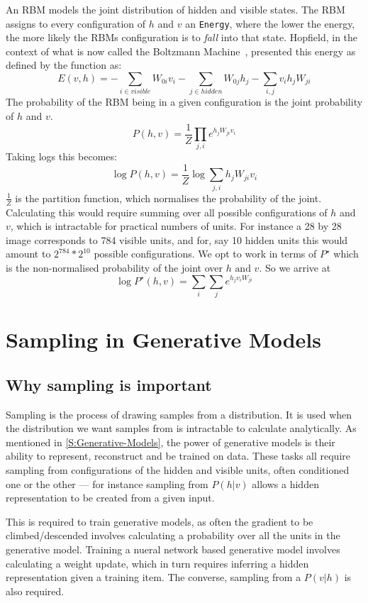 An RBM models the joint distribution of hidden and visible states.
The RBM assigns to every configuration of $h$ and $v$ an \texttt{Energy}, where the lower the energy, the more likely the RBMs configuration is to \textit{fall} into that state. Hopfield, in the context of what is now called the Boltzmann Machine~\cite{Hopfield01041982}, presented this energy as defined by the function as:
$$ E(v,h) = -\sum_{i \in visible}{W_{0i}v_i}   -\sum_{j \in hidden}{W_{0j}h_j}  -\sum_{i,j}{v_ih_jW_{ji}}  $$
The probability of the RBM being in a given configuration is the joint probability of $h$ and $v$.
$$ P(h,v) = \frac{1}{Z} \prod_{j,i} e^{h_jW_{ji}v_i} $$
Taking logs this becomes:
$$ \log P(h,v) = \frac{1}{Z} \log \sum_{j,i} h_j W_{ji} v_i $$
$\frac{1}{Z} $ is the partition function, which normalises the probability of the joint. Calculating this would require summing over all possible configurations of $h$ and $v$, which is intractable for practical numbers of units. For instance a 28 by 28 image corresponds to 784 visible units, and for, say 10 hidden units this would amount to $2^{784} * 2^{10} $ possible configurations. We opt to work in terms of $P^\star$ which is the non-normalised probability of the joint over $h \text{ and } v$.
So we arrive at
\begin{equation}\label{eq:LogPJoint}
   \log P^\star(h, v) = \sum_i \sum_j e^{h_j v_i W_{ji}}
\end{equation}

\section{Sampling in Generative Models}

\subsection{Why sampling is important}

Sampling is the process of drawing samples from a distribution. It is used when the distribution we want samples from is intractable to calculate analytically. As mentioned in \ref{S:Generative-Models}, the power of generative models is their ability to represent, reconstruct and be trained on data. These tasks all require sampling from configurations of the hidden and visible units, often conditioned one or the other --- for instance sampling from $P(h|v)$ allows a hidden representation to be created from a given input.

This is required to train generative models, as often the gradient to be climbed/descended involves calculating a probability over all the units in the generative model. Training a nueral network based generative model involves calculating a weight update, which in turn requires inferring a hidden representation given a training item. The converse, sampling from a $P(v|h)$ is also required. 


